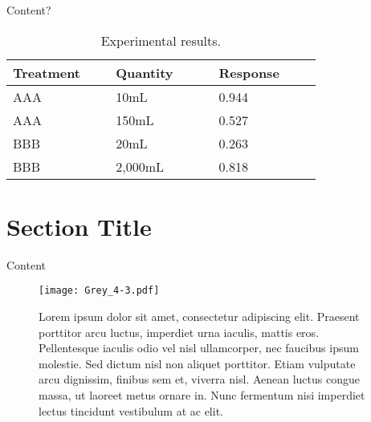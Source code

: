 \documentclass[
]{ImperialPoster}
\begin{document}
\begin{multicols}{3}
	Content?

	\begin{table}[H] %
		\caption{Experimental results.}
		\begin{tabular}{L{0.26\linewidth} C{0.26\linewidth} R{0.26\linewidth}}
			\toprule
			Treatment & Quantity & Response\\
			\midrule
			AAA & 10mL & 0.944\\
			AAA & 150mL & 0.527\\
			BBB & 20mL & 0.263\\
			BBB & 2,000mL & 0.818\\
			\bottomrule
		\end{tabular}
	\end{table}

	\columnbreak{} %


	\section{Section Title}

	Content


	\begin{figure}[H] %
		\texttt{[image: Grey\_4-3.pdf]} %
		\parbox{0.66\textwidth}{\caption{Lorem ipsum dolor sit amet, consectetur adipiscing elit. Praesent porttitor arcu luctus, imperdiet urna iaculis, mattis eros. Pellentesque iaculis odio vel nisl ullamcorper, nec faucibus ipsum molestie. Sed dictum nisl non aliquet porttitor. Etiam vulputate arcu dignissim, finibus sem et, viverra nisl. Aenean luctus congue massa, ut laoreet metus ornare in. Nunc fermentum nisi imperdiet lectus tincidunt vestibulum at ac elit.}} %
	\end{figure}


\end{multicols}
\end{document}
